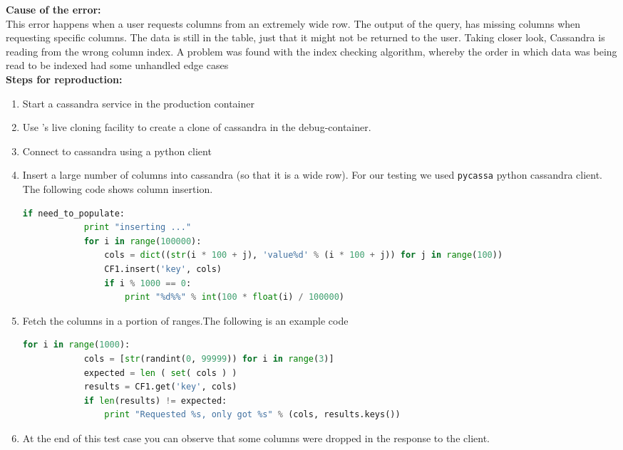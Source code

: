 \noindent \textbf{Cause of the error:} \\

This error happens when a user requests columns from an extremely wide row.
The output of the query, has missing columns when requesting specific columns. 
The data is still in the table, just that it might not be returned to the user. 
Taking closer look, Cassandra is reading from the wrong column index. 
A problem was found with the index checking algorithm, whereby the order in which data was being read to be indexed had some unhandled edge cases\\

\noindent \textbf{Steps for reproduction:} \\

\begin{adjustwidth}{0.5cm}{}
	\begin{enumerate}
		\item Start a cassandra service in the production container
		\item Use \parikshan's live cloning facility to create a clone of cassandra in the debug-container.
		\item Connect to cassandra using a python client
		\item Insert a large number of columns into cassandra (so that it is a wide row). For our testing we used \texttt{pycassa} python cassandra client. The following code shows column insertion.
		
		\begin{lstlisting}[language=python]
		if need_to_populate:
			print "inserting ..."
			for i in range(100000):
				cols = dict((str(i * 100 + j), 'value%d' % (i * 100 + j)) for j in range(100))
				CF1.insert('key', cols)
				if i % 1000 == 0:
					print "%d%%" % int(100 * float(i) / 100000)
		\end{lstlisting}
		
		\item Fetch the columns in a portion of ranges.The following is an example code
		
		\begin{lstlisting}[language=python]
		for i in range(1000):
			cols = [str(randint(0, 99999)) for i in range(3)]
			expected = len ( set( cols ) )
			results = CF1.get('key', cols)
			if len(results) != expected:
				print "Requested %s, only got %s" % (cols, results.keys())
		\end{lstlisting}
		
		\item At the end of this test case you can observe that some columns were dropped in the response to the client.
	\end{enumerate}

\end{adjustwidth}

